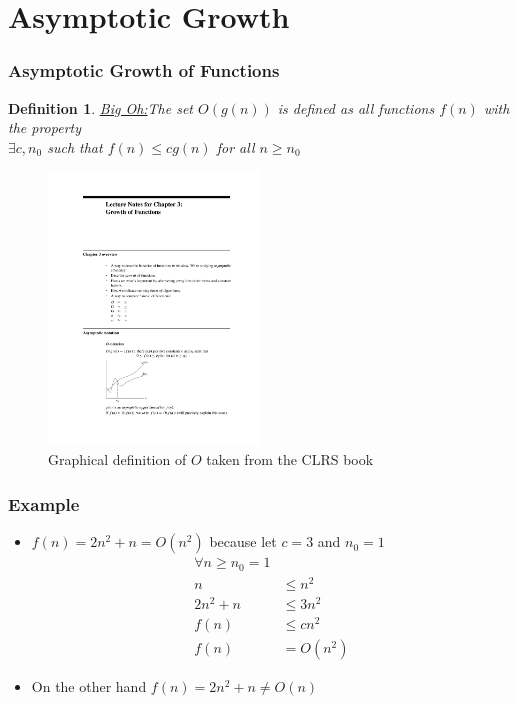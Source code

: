 \documentclass{beamer}
\newtheorem{mydef}{Definition}
\newcommand{\emphasis}[1]{\ul{#1}}
\begin{document}
\section{Asymptotic Growth}
\begin{frame}

\frametitle{Asymptotic Growth of Functions}
\begin{mydef}
\emphasis{Big Oh:}The set $O(g(n))$ is defined as all functions $f(n)$ with the property\\
$\exists c,n_0$ such that $f(n)\le c g(n)$ for all $n\ge n_0$
\end{mydef}
\begin{figure}[h]
  \centering
  \includegraphics[width=0.5\textwidth]{complexity-figs/Big-Oh.pdf}
\caption{Graphical definition of $O$ taken from the CLRS book}
\end{figure}
\end{frame}


\begin{frame}
  \frametitle{Example}
  \begin{itemize}
  \item $f(n)=2n^2+n=O(n^2)$ because let $c=3$ and $n_0=1$
    \begin{align*}
     \forall n\ge n_0=1\\
     n&\le n^2\\
     2n^2+n&\le 3n^2\\
     f(n)&\le c n^2\\
     f(n)&=O(n^2)
    \end{align*}
  \item On the other hand $f(n)=2n^2+n\ne O(n)$
  \end{itemize}
\end{frame}
\end{document}
